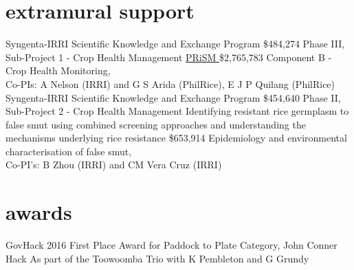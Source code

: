 \section*{extramural support}
  \begin{entrylist}
	{Syngenta-IRRI Scientific Knowledge and Exchange Program}
	{\$484,274}
	{Phase III, Sub-Project 1 - Crop Health Management}
	{\href{http://philippinericeinfo.ph/}{PRiSM }}
	{\$2,765,783}
	{Component B - Crop Health Monitoring,\\Co-PIs: A Nelson (IRRI) and G S Arida (PhilRice), E J P Quilang (PhilRice)}
	{Syngenta-IRRI Scientific Knowledge and Exchange Program}
	{\$454,640}
	{Phase II, Sub-Project 2 - Crop Health Management}
    {Identifying resistant rice germplasm to false smut using combined screening approaches and understanding the mechanisms underlying rice resistance}
    {\$653,914}
    {Epidemiology and environmental characterisation of false smut,\\Co-PI's: B Zhou (IRRI) and CM Vera Cruz (IRRI)}
  \end{entrylist}

  \section*{awards}
    \begin{entrylist}
    {GovHack 2016 First Place Award for Paddock to Plate Category, John Conner Hack}
    {}
    {As part of the Toowoomba Trio with K Pembleton and G Grundy}      \end{entrylist}
